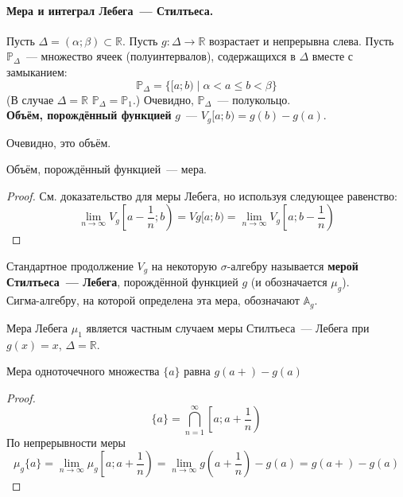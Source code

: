 \documentclass{article}
\begin{document}
    \paragraph{Мера и интеграл Лебега~--- Стилтьеса.}
    \begin{definition}
        Пусть $\Delta=(\alpha;\beta)\subset\mathbb R$. Пусть $g\colon\Delta\to\mathbb R$ возрастает и непрерывна слева. Пусть $\mathbb P_\Delta$~--- множество ячеек (полуинтервалов), содержащихся в $\Delta$ вместе с замыканием:
        $$
        \mathbb P_\Delta=\{[a;b)\mid \alpha<a\leqslant b<\beta\}
        $$
        (В случае $\Delta=\mathbb R$ $\mathbb P_\Delta=\mathbb P_1$.) Очевидно, $\mathbb P_\Delta$~--- полукольцо.\\
        \textbf{Объём, порождённый функцией} $g$~--- $V_g[a;b)=g(b)-g(a)$.
    \end{definition}
    \begin{property}
        Очевидно, это объём.
    \end{property}
    \begin{property}
        Объём, порождённый функцией~--- мера.
    \end{property}
    \begin{proof}
        См. доказательство для меры Лебега, но используя следующее равенство:
        $$
        \lim\limits_{n\to\infty}V_g\left[a-\frac1n;b\right)=Vg[a;b)=\lim\limits_{n\to\infty}V_g\left[a;b-\frac1n\right)
        $$
    \end{proof}
    \begin{definition}
        Стандартное продолжение $V_g$ на некоторую $\sigma$-алгебру называется \textbf{мерой Стилтьеса~--- Лебега}, порождённой функцией $g$ (и обозначается $\mu_g$).\\
        Сигма-алгебру, на которой определена эта мера, обозначают $\mathbb A_g$.
    \end{definition}
    \begin{remark}
        Мера Лебега $\mu_1$ является частным случаем меры Стилтьеса~--- Лебега при $g(x)=x$, $\Delta=\mathbb R$.
    \end{remark}
    \begin{property}
        Мера одноточечного множества $\{a\}$ равна $g(a+)-g(a)$
    \end{property}
    \begin{proof}
        $$
        \{a\}=\bigcap\limits_{n=1}^\infty \left[a;a+\frac1n\right)
        $$
        По непрерывности меры
        $$
        \mu_g\{a\}=\lim\limits_{n\to\infty}\mu_g\left[a;a+\frac1n\right)=\lim\limits_{n\to\infty}g\left(a+\frac1n\right)-g(a)=g(a+)-g(a)
        $$
    \end{proof}
\end{document}
